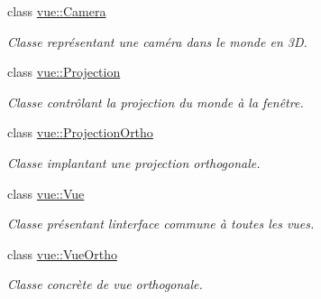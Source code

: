 \begin{DoxyCompactItemize}
class \hyperlink{classvue_1_1_camera}{vue\+::\+Camera}
\begin{DoxyCompactList}\small\item\em Classe représentant une caméra dans le monde en 3\+D. \end{DoxyCompactList}\item 
class \hyperlink{classvue_1_1_projection}{vue\+::\+Projection}
\begin{DoxyCompactList}\small\item\em Classe contrôlant la projection du monde à la fenêtre. \end{DoxyCompactList}\item 
class \hyperlink{classvue_1_1_projection_ortho}{vue\+::\+Projection\+Ortho}
\begin{DoxyCompactList}\small\item\em Classe implantant une projection orthogonale. \end{DoxyCompactList}\item 
class \hyperlink{classvue_1_1_vue}{vue\+::\+Vue}
\begin{DoxyCompactList}\small\item\em Classe présentant l\textquotesingle{}interface commune à toutes les vues. \end{DoxyCompactList}\item 
class \hyperlink{classvue_1_1_vue_ortho}{vue\+::\+Vue\+Ortho}
\begin{DoxyCompactList}\small\item\em Classe concrète de vue orthogonale. \end{DoxyCompactList}\end{DoxyCompactItemize}
